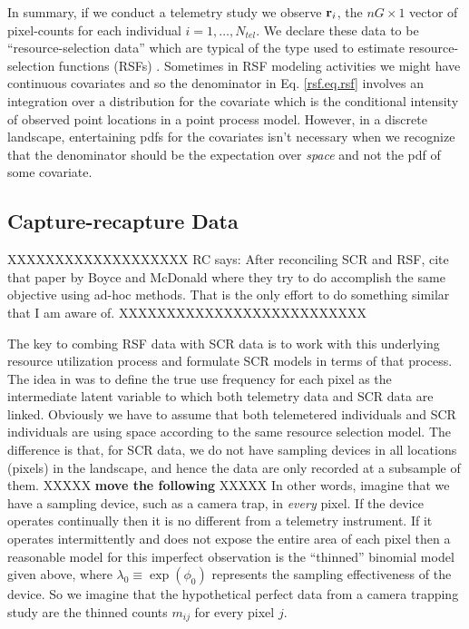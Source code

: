 In summary, if we conduct a telemetry study we observe ${\bf r}_{i}$,
the $nG \times 1$ vector of pixel-counts for each individual
$i=1,\ldots,N_{tel}$.  We declare these data to be
``resource-selection data'' which are typical of the type used to
estimate resource-selection functions (RSFs) \citep{manly_etal:2002}.
Sometimes in RSF modeling activities we might have
continuous covariates and so the denominator in Eq. \ref{rsf.eq.rsf}
involves an integration over a distribution for the covariate which is
the conditional intensity of observed point locations in a point
process model. However, in a discrete landscape, entertaining pdfs for
the covariates isn't necessary \citep{royle_etal:2012mee} when we
recognize that the denominator should be the expectation over {\it
  space} and not the pdf of some covariate.


\subsection{Capture-recapture Data}

XXXXXXXXXXXXXXXXXXX
RC says: After reconciling SCR and RSF, cite that paper
by Boyce and McDonald where they try to do accomplish the same
objective using ad-hoc methods. That is the only effort to do
something similar that I am aware of.
XXXXXXXXXXXXXXXXXXXXXXXXXX

The key to combing RSF data with SCR data is to work with this
underlying resource utilization process and formulate SCR models in
terms of that process. The idea in \citep{royle_etal:2012mee} was to
define the true use frequency for each pixel as 
the intermediate latent variable to which both telemetry data and SCR
data are linked.
Obviously we have to assume that both telemetered individuals
and SCR individuals are using space according to the same resource
selection model. The difference is that, for SCR data, we do not have
sampling devices in all locations (pixels) in the landscape, and hence
the data are only recorded at a subsample of them. XXXXX {\bf move the
  following } XXXXX
In other words,
imagine that we have a sampling device, such as a camera trap, in {\it
  every} pixel. If the device operates continually then it is no
different from a telemetry instrument.  If it operates intermittently
and does not expose the entire area of each pixel then a reasonable
model for this imperfect observation is the ``thinned'' binomial model
given above, where $\lambda_{0} \equiv \exp(\phi_{0})$ represents the
sampling effectiveness of the device. So we imagine that the
hypothetical perfect data from a camera trapping study are the thinned
counts $m_{ij}$ for every pixel $j$.

